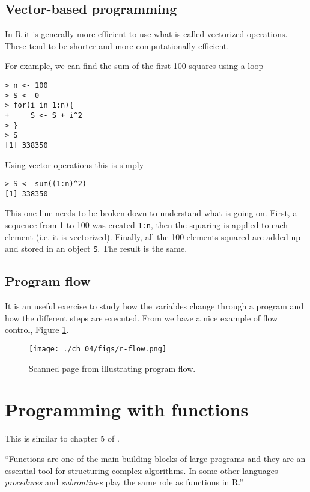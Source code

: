 \subsection{Vector-based programming}

In R it is generally more efficient to use what is called vectorized
operations. These tend to be shorter and more computationally
efficient.

For example, we can find the sum of the first 100 squares using a loop

\begin{lstlisting}
> n <- 100
> S <- 0
> for(i in 1:n){
+     S <- S + i^2
> }
> S
[1] 338350
\end{lstlisting}

Using vector operations this is simply

\begin{lstlisting}
> S <- sum((1:n)^2)
[1] 338350
\end{lstlisting}

This one line needs to be broken down to understand what is going
on. First, a sequence from 1 to 100 was created \texttt{1:n}, then the
squaring is applied to each element (i.e. it is vectorized). Finally,
all the 100 elements squared are added up and stored in an object
\texttt{S}. The result is the same.

\subsection{Program flow}

It is an useful exercise to study how the variables change through a
program and how the different steps are executed. From
\citet{R:Jones:2009} we have a nice example of flow control, Figure
\ref{fig:r-flow}.


\begin{figure}[htpb!]
  \centering
  \texttt{[image: ./ch\_04/figs/r-flow.png]}
  \caption{Scanned page from \citet{R:Jones:2009} illustrating program flow.}
  \label{fig:r-flow}
\end{figure}

\section{Programming with functions}

This is similar to chapter 5 of \citet{R:Jones:2009}.

``Functions are one of the main building blocks of large programs and
they are an essential tool for structuring complex algorithms. In
some other languages \emph{procedures} and \emph{subroutines} play the
same role as functions in R.''

